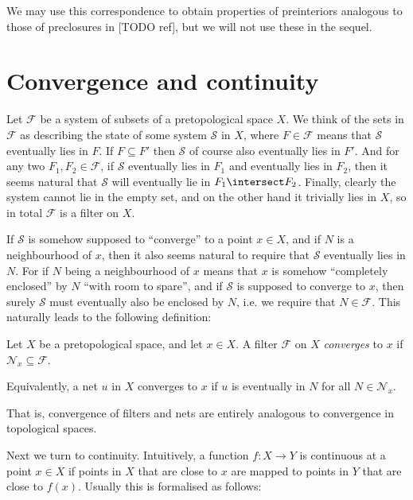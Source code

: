\documentclass[article, a4paper, 11pt, oneside]{memoir}
\numberwithin{equation}{chapter}
\newcommand{\calF}{\mathcal{F}}
\newcommand{\calS}{\mathcal{S}}
\newcommand{\calN}{\mathcal{N}}
\newcommand{\nhoods}[1]{\calN_{#1}}
\begin{document}
We may use this correspondence to obtain properties of preinteriors analogous to those of preclosures in [TODO ref], but we will not use these in the sequel.




\section{Convergence and continuity}

Let $\calF$ be a system of subsets of a pretopological space $X$. We think of the sets in $\calF$ as describing the state of some system $\calS$ in $X$, where $F \in \calF$ means that $\calS$ eventually lies in $F$. If $F \subseteq F'$ then $\calS$ of course also eventually lies in $F'$. And for any two $F_1, F_2 \in \calF$, if $\calS$ eventually lies in $F_1$ and eventually lies in $F_2$, then it seems natural that $\calS$ will eventually lie in $F_1 \intersect F_2$. Finally, clearly the system cannot lie in the empty set, and on the other hand it trivially lies in $X$, so in total $\calF$ is a filter on $X$.

If $\calS$ is somehow supposed to \enquote{converge} to a point $x \in X$, and if $N$ is a neighbourhood of $x$, then it also seems natural to require that $\calS$ eventually lies in $N$. For if $N$ being a neighbourhood of $x$ means that $x$ is somehow \enquote{completely enclosed} by $N$ \enquote{with room to spare}, and if $\calS$ is supposed to converge to $x$, then surely $\calS$ must eventually also be enclosed by $N$, i.e. we require that $N \in \calF$. This naturally leads to the following definition:

\begin{definition}
    Let $X$ be a pretopological space, and let $x \in X$. A filter $\calF$ on $X$ \emph{converges} to $x$ if $\nhoods{x} \subseteq \calF$.

    Equivalently, a net $u$ in $X$ converges to $x$ if $u$ is eventually in $N$ for all $N \in \nhoods{x}$.
\end{definition}
%
That is, convergence of filters and nets are entirely analogous to convergence in topological spaces.

Next we turn to continuity. Intuitively, a function $f \colon X \to Y$ is continuous at a point $x \in X$ if points in $X$ that are close to $x$ are mapped to points in $Y$ that are close to $f(x)$. Usually this is formalised as follows:
\end{document}
